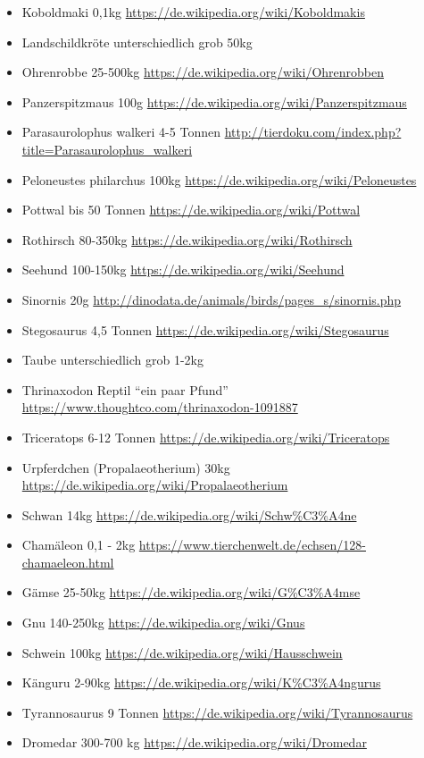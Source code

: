 \begin{itemize}
  \item Koboldmaki 0,1kg \url{https://de.wikipedia.org/wiki/Koboldmakis}
  \item Landschildkröte unterschiedlich grob 50kg
  \item Ohrenrobbe 25-500kg \url{https://de.wikipedia.org/wiki/Ohrenrobben}
  \item Panzerspitzmaus 100g \url{https://de.wikipedia.org/wiki/Panzerspitzmaus}
  \item Parasaurolophus walkeri 4-5 Tonnen \url{http://tierdoku.com/index.php?title=Parasaurolophus_walkeri}
  \item Peloneustes philarchus 100kg \url{https://de.wikipedia.org/wiki/Peloneustes}
  \item Pottwal bis 50 Tonnen \url{https://de.wikipedia.org/wiki/Pottwal}
  \item Rothirsch 80-350kg \url{https://de.wikipedia.org/wiki/Rothirsch}
  \item Seehund 100-150kg \url{https://de.wikipedia.org/wiki/Seehund}
  \item Sinornis 20g \url{http://dinodata.de/animals/birds/pages_s/sinornis.php}
  \item Stegosaurus 4,5 Tonnen \url{https://de.wikipedia.org/wiki/Stegosaurus}
  \item Taube unterschiedlich grob 1-2kg
  \item Thrinaxodon Reptil "`ein paar Pfund"' \url{https://www.thoughtco.com/thrinaxodon-1091887}
  \item Triceratops 6-12 Tonnen \url{https://de.wikipedia.org/wiki/Triceratops}
  \item Urpferdchen (Propalaeotherium) 30kg \url{https://de.wikipedia.org/wiki/Propalaeotherium}
  \item Schwan 14kg \url{https://de.wikipedia.org/wiki/Schw\%C3\%A4ne}
  \item Chamäleon 0,1 - 2kg \url{https://www.tierchenwelt.de/echsen/128-chamaeleon.html}
  \item Gämse 25-50kg \url{https://de.wikipedia.org/wiki/G\%C3\%A4mse}
  \item Gnu 140-250kg \url{https://de.wikipedia.org/wiki/Gnus}
  \item Schwein 100kg \url{https://de.wikipedia.org/wiki/Hausschwein}
  \item Känguru 2-90kg \url{https://de.wikipedia.org/wiki/K\%C3\%A4ngurus}
  \item Tyrannosaurus 9 Tonnen \url{https://de.wikipedia.org/wiki/Tyrannosaurus}
  \item Dromedar 300-700 kg \url{https://de.wikipedia.org/wiki/Dromedar}

\end{itemize}
